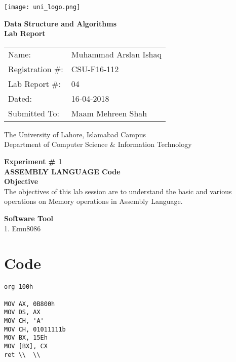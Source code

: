 \documentclass[11pt]{article}            %
\begin{document}
\begin{titlepage}
    \centering
  \vfill
    \texttt{[image: uni\_logo.png]} \\ 
	\vskip2cm
    {\bfseries\Large
	Data Structure and Algorithms \\ 
	
	\vskip2cm
	Lab Report 
	 
	\vskip2cm
	}    

\begin{center}
\begin{tabular}{ l l  } 

Name: & Muhammad Arslan Ishaq \\ 
Registration \#: & CSU-F16-112 \\ 
Lab Report \#: & 04 \\ 
 Dated:& 16-04-2018\\ 
Submitted To:& Maam Mehreen Shah\\ 

\end{tabular}
\end{center}
    \vfill
    The University of Lahore, Islamabad Campus\\
Department of Computer Science \& Information Technology
\end{titlepage}


    
    {\bfseries\Large
\centering
	Experiment \# 1 \\

ASSEMBLY LANGUAGE Code  \\
	
	}    
 \vskip1cm
 \textbf {Objective}\\  The objectives of this lab session are to understand the basic and various operations on Memory operations in Assembly Language. 
 
 \textbf {Software Tool} \\
1.   Emu8086\ 


\section{Code }              
\begin{lstlisting}
org 100h

MOV AX, 0B800h
MOV DS, AX
MOV CH, 'A'
MOV CH, 01011111b
MOV BX, 15Eh
MOV [BX], CX
ret \\  \\
\end{lstlisting}
\end{document}
